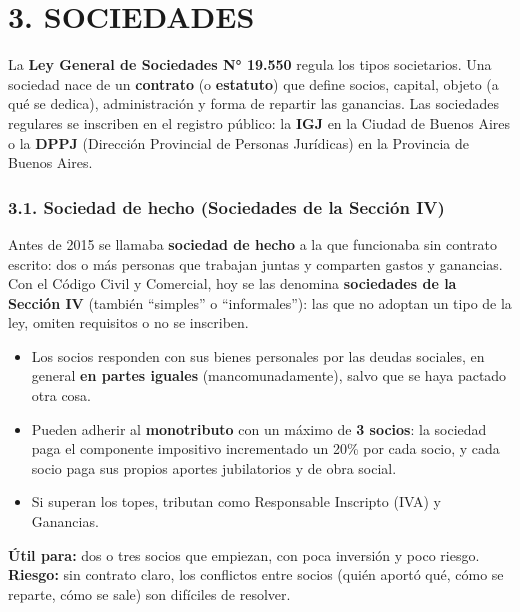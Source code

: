 \section*{3. SOCIEDADES}

La \textbf{Ley General de Sociedades N° 19.550} regula los tipos societarios. Una sociedad
nace de un \textbf{contrato} (o \textbf{estatuto}) que define socios, capital, objeto (a qué se
dedica), administración y forma de repartir las ganancias. Las sociedades regulares se
inscriben en el registro público: la \textbf{IGJ} en la Ciudad de Buenos Aires o la
\textbf{DPPJ} (Dirección Provincial de Personas Jurídicas) en la Provincia de Buenos Aires.

\subsubsection*{3.1. Sociedad de hecho (Sociedades de la Sección IV)}
Antes de 2015 se llamaba \textbf{sociedad de hecho} a la que funcionaba sin contrato escrito:
dos o más personas que trabajan juntas y comparten gastos y ganancias. Con el Código Civil y
Comercial, hoy se las denomina \textbf{sociedades de la Sección IV} (también ``simples'' o
``informales''): las que no adoptan un tipo de la ley, omiten requisitos o no se inscriben.

\begin{itemize}
  \item Los socios responden con sus bienes personales por las deudas sociales, en general
        \textbf{en partes iguales} (mancomunadamente), salvo que se haya pactado otra cosa.
  \item Pueden adherir al \textbf{monotributo} con un máximo de \textbf{3 socios}: la sociedad
        paga el componente impositivo incrementado un 20\% por cada socio, y cada socio paga
        sus propios aportes jubilatorios y de obra social.
  \item Si superan los topes, tributan como Responsable Inscripto (IVA) y Ganancias.
\end{itemize}
\textbf{Útil para:} dos o tres socios que empiezan, con poca inversión y poco riesgo.
\textbf{Riesgo:} sin contrato claro, los conflictos entre socios (quién aportó qué, cómo se
reparte, cómo se sale) son difíciles de resolver.

